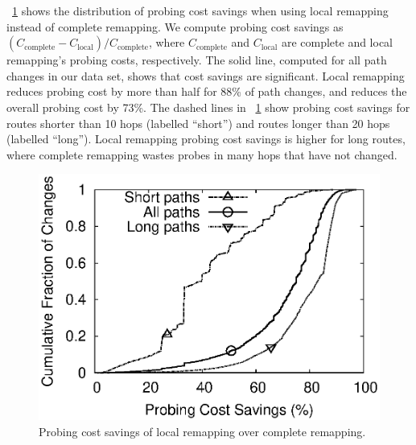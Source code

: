 
\figstr~\ref{fig:sim.savings.cmp} shows the distribution of probing cost
savings when using local remapping instead of complete remapping.  We
compute probing cost savings as $(C_\mathrm{complete} -
C_\mathrm{local})/C_\mathrm{complete}$, where $C_\mathrm{complete}$ and
$C_\mathrm{local}$ are complete and local remapping's probing costs,
respectively.  The solid line, computed for all path changes in our data
set, shows that cost savings are significant.  Local remapping reduces
probing cost by more than half for 88\% of path changes, and reduces the
overall probing cost by 73\%.  The dashed lines in
\figstr~\ref{fig:sim.savings.cmp} show probing cost savings for routes
shorter than 10 hops (labelled ``short'') and routes longer than 20 hops
(labelled ``long'').  Local remapping probing cost savings is higher for
long routes, where complete remapping wastes probes in many hops that
have not changed.


\begin{figure}
\begin{center}
\includegraphics[width=0.8\columnwidth]{figs/probsavings.eps}
\caption{Probing cost savings of local remapping over complete
remapping.}
\label{fig:sim.savings.cmp}
\end{center}
\end{figure}

